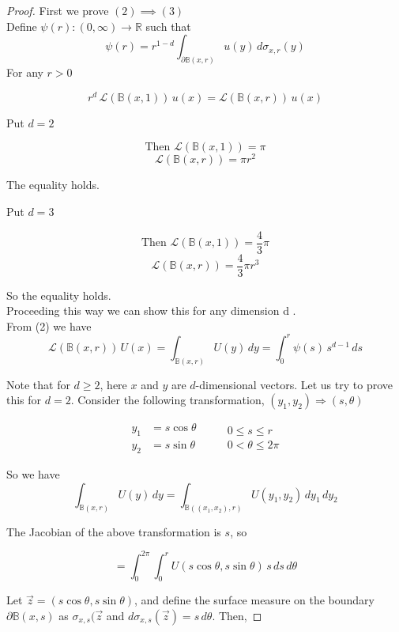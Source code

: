 \documentclass[11pt, a4paper, oneside]{report}
\numberwithin{equation}{section}
\begin{document}
\begin{proof}
First we prove \((2) \implies (3)\)\\
Define \(\psi(r) : (0,\infty) \to \mathbb{R}\) such that 
\[
\psi(r) = r^{1 - d} \int_{\partial \mathbb{B}(x, r)} u(y) \, d\sigma_{x, r}(y)
\]
For any \(r >0\)


\[
r^d \, \mathscr{L}(\mathbb{B}(x,1)) \, u(x) = \mathscr{L}(\mathbb{B}(x,r)) \, u(x)
\]

Put \( d = 2 \)

\[
\text{Then } \mathscr{L}(\mathbb{B}(x,1)) = \pi
\]
\[
\mathscr{L}(\mathbb{B}(x,r)) = \pi r^2
\]

The equality holds.

Put \( d = 3 \)

\[
\text{Then } \mathscr{L}(\mathbb{B}(x,1)) = \frac{4}{3} \pi
\]
\[
\mathscr{L}(\mathbb{B}(x,r)) = \frac{4}{3} \pi r^3
\]

So the equality holds.\\
Proceeding this way we can show this for any dimension d .\\

\noindent From (2) we have
\[
\mathscr{L}(\mathbb{B}(x,r))\,U(x) = \int_{\mathbb{B}(x,r)} U(y)\,dy = \int_0^r \psi(s)\,s^{d-1}\,ds
\]

\noindent Note that for \( d \geq 2 \), here \( x \) and \( y \) are \( d \)-dimensional vectors.  
Let us try to prove this for \( d = 2 \).  
Consider the following transformation, \( (y_1, y_2) \Rightarrow (s, \theta) \)

\[
\begin{aligned}
    y_1 &= s \cos \theta \\
    y_2 &= s \sin \theta
\end{aligned}
\quad \quad
\begin{aligned}
    0 \leq s \leq r \\
    0 < \theta \leq 2\pi
\end{aligned}
\]

So we have
\[
\int_{\mathbb{B}(x,r)} U(y)\,dy = \int_{\mathbb{B}((x_1,x_2),r)} U(y_1,y_2)\,dy_1\,dy_2
\]

The Jacobian of the above transformation is \( s \), so

\[
= \int_0^{2\pi} \int_0^r U(s\cos\theta, s\sin\theta)\,s\,ds\,d\theta
\]

Let \( \vec{z} = (s\cos\theta, s\sin\theta) \), and define the surface measure on the boundary \( \partial \mathbb{B}(x,s) \) as \(\sigma_{x,s}(\vec{z}\) and \( d\sigma_{x,s}(\vec{z}) = s\,d\theta \). Then,


\end{proof}
\end{document}
